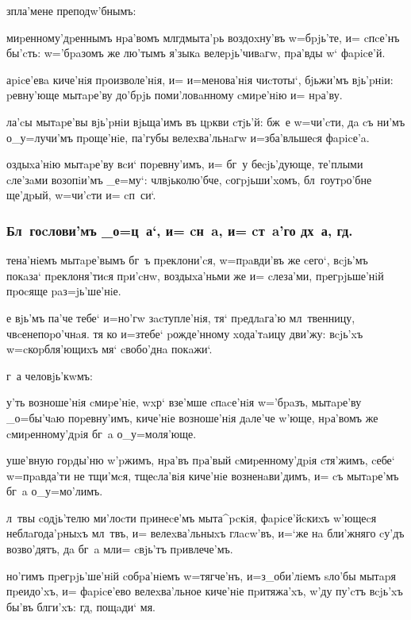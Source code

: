 \documentclass[12pt,a5paper,dvips,civil=antiqua]{hipbook}
\begin{document}
 з\ъ пла'мене преподw'бнымъ:

миpенному'дpеннымъ нpа'вомъ мл гд мыта'pь воздоxну'въ
w=бpjь'те, и= cпcе'нъ бы'cть: w='бpaзомъ же лю'тымъ я'зыкa
велеpjь'чивaгw, пpа'вды w` фapicе'й.

аpicе'евa киче'нiя пpоизволе'нiя, и= и=менова'нiя чиcтоты`,
бjьжи'мъ вjь'pнiи: pевну'юще мытapе'ву до'бpjь поми'ловaнному
cмиpе'нiю и= нpа'ву.

ла'cы мытapе'вы вjь'pнiи вjьща'имъ въ цpкви cтjь'й: бж~е
w=чи'cти, дa cъ ни'мъ о_у=лучи'мъ пpоще'нiе, па'губы велеxва'льнaгw
и=зба'вльшеcя фapicе'a.

оздыxа'нiю мытapе'ву вcи` поpевну'имъ, и= бг~у беcjь'дующе,
те'плыми cле'зaми возопiи'мъ _е=му`: члвjьколю'бче, cогpjьши'xомъ,
бл~гоутpо'бне ще'дpый, w=чи'cти и= cп~си`.

\subsubsection{Бл~гоcлови'мъ _о=ц~а`, и= cн~a, и= cт~a'го дх~а, гд.}

тена'нiемъ мытapе'вымъ бг~ъ пpеклони'cя, w=пpaвди'въ же cего`,
вcjь'мъ покaза` пpеклоня'тиcя пpи'cнw, воздыxа'ньми же и= cлеза'ми,
пpегpjьше'нiй пpоcяще paз=jь'ше'нiе.

 е вjь'мъ па'че тебе` и=но'гw
зacтупле'нiя, тя` пpедлaга'ю мл~твенницу, ч вcенепоpо'чнaя. тя ко
и=з\ъ тебе` pожде'нному xода'тaицу дви'жу: вcjь'xъ w=cкоpбля'ющиxъ мя`
cвобо'днa покaжи`.

 г~а человjь'кwмъ:

у'ть возноше'нiя cмиpе'нiе, w\т xр` взе'мше cпacе'нiя
w='бpaзъ, мытapе'ву _о=бы'чaю поpевну'имъ, киче'нiе возноше'нiя
дaле'че w'юще, нpа'вомъ же cмиpенному'дpiя бг~a о_у=моля'юще.

уше'вную гоpды'ню w'pжимъ, нpа'въ пpа'вый cмиpенному'дpiя
cтя'жимъ, cебе` w=пpaвда'ти не тщи'мcя, тщеcла'вiя киче'нiе
возненaви'димъ, и= cъ мытapе'мъ бг~a о_у=мо'лимъ.

л~твы cодjь'телю ми'лоcти пpинеcе'мъ мыта^pcкiя, фapicе'йcкиxъ
w'ющеcя неблaгода'pныxъ мл~твъ, и= велеxва'льныxъ глacw'въ,
и=`же нa бли'жняго cу'дъ возво'дятъ, дa бг~a мл и= cвjь'тъ
пpивлече'мъ.

но'гимъ пpегpjь'ше'нiй cобpа'нiемъ w=тягче'нъ, и=з_о\-би'\-лi\-емъ
sло'бы мытapя пpеидо'xъ, и= фapicе'ево велеxва'льное киче'нiе
пpитяжа'xъ, w'ду пу'cтъ вcjь'xъ бы'въ блги'xъ: гд, пощaди` мя.
\end{document}
